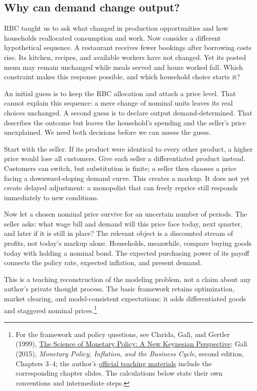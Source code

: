 \subsection{Why can demand change output?}

RBC taught us to ask what changed in production opportunities and how households
reallocated consumption and work. Now consider a different hypothetical sequence.
A restaurant receives fewer bookings after borrowing costs rise. Its kitchen,
recipes, and available workers have not changed. Yet its posted menu may remain
unchanged while meals served and hours worked fall. Which constraint makes this
response possible, and which household choice starts it?

An initial guess is to keep the RBC allocation and attach a price level. That
cannot explain this sequence: a mere change of nominal units leaves its real
choices unchanged. A second guess is to declare output demand-determined. That
describes the outcome but leaves the household's spending and the seller's price
unexplained. We need both decisions before we can assess the guess.

Start with the seller. If its product were identical to every other product,
a higher price would lose all customers. Give each seller a differentiated
product instead. Customers can switch, but substitution is finite; a seller
then chooses a price facing a downward-sloping demand curve. This creates a
markup. It does not yet create delayed adjustment: a monopolist that can freely
reprice still responds immediately to new conditions.

Now let a chosen nominal price survive for an uncertain number of periods.
The seller asks: what wage bill and demand will this price face today, next
quarter, and later if it is still in place? The relevant object is a discounted
stream of profits, not today's markup alone. Households, meanwhile, compare
buying goods today with holding a nominal bond. The expected purchasing power
of its payoff connects the policy rate, expected inflation, and present demand.

This is a teaching reconstruction of the modeling problem, not a claim about
any author's private thought process. The basic framework retains optimization,
market clearing, and model-consistent expectations; it adds differentiated goods
and staggered nominal prices.\footnote{For the framework and policy questions,
see Clarida, Gal\'{\i}, and Gertler (1999),
\href{https://www.nber.org/papers/w7147}{The Science of Monetary Policy: A New
Keynesian Perspective}; Gal\'{\i} (2015), \textit{Monetary Policy, Inflation, and
the Business Cycle}, second edition, Chapters 3--4; the author's
\href{https://crei.cat/people/gali/}{official teaching materials} include the
corresponding chapter slides. The calculations below
state their own conventions and intermediate steps.}

